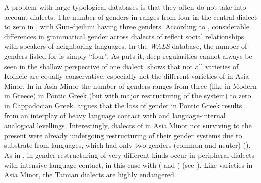 \documentclass[output=collectionpaper]{langsci/langscibook}
\begin{document}
A problem with large typological databases is that they often do not take into account dialects. The number of genders in  ranges from four in the central  dialect to zero in , with Gun-djeihmi having three genders. According to \cite{Evans1997}, considerable differences in grammatical gender across dialects of  reflect social relationships with speakers of neighboring languages. In the \textit{WALS} database, the number of genders listed for  is simply ``four''. As \cite[105]{Evans1997} puts it, deep regularities cannot always be seen in the shallow perspective of one dialect. \cite{Karatsareas2014} shows that not all varieties of Koineic  are equally conservative, especially not the different varieties of  in Asia Minor. In  in Asia Minor the number of genders ranges from three (like in Modern  in Greece) in Pontic Greek (but with major restructuring of the system) to zero in Cappadocian Greek. \cite{Karatsareas2009} argues that the loss of gender in Pontic Greek results from an interplay of heavy language contact with  and language-internal analogical levellings. Interestingly, dialects of  in Asia Minor not surviving to the present were already undergoing restructuring of their gender systems due to substrate from  languages, which had only two genders (common and neuter) (\citealt[176]{Brixhe1994}). As in , in  gender restructuring of very different kinds occur in peripheral dialects with intensive language contact, in this case with  ( and ) (see \citealt{Waelchli2017}). Like  varieties in Asia Minor, the Tamian  dialects are highly endangered.
\end{document}
